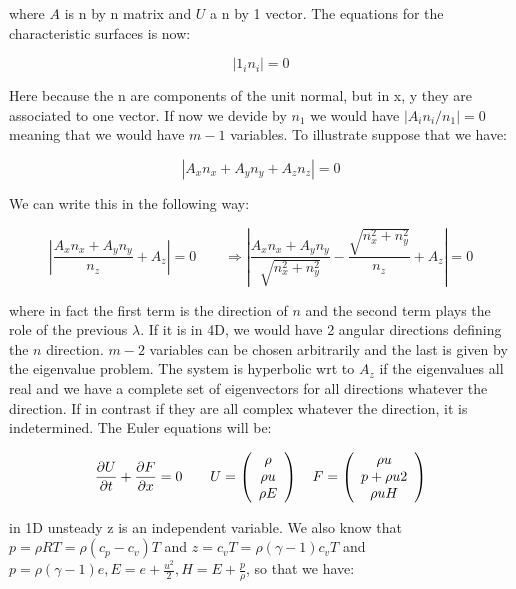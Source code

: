 where $A$ is n by n matrix and $U$ a n by 1 vector. The equations for the characteristic surfaces is now: 

\begin{equation}
|1_i n_i| = 0
\end{equation}

Here because the n are components of the unit normal, but in x, y they are associated to one vector. If now we devide by $n_1$ we would have $|A_i n_i/n_1| = 0$ meaning that we would have $m-1$ variables. To illustrate suppose that we have: 

\begin{equation}
|A_x n_x + A_yn_y + A_zn_z | = 0
\end{equation}

We can write this in the following way: 

\begin{equation}
\left|\frac{A_x n_x + A_y n_y}{n_z } + A_z\right| = 0 \qquad \Rightarrow \left|\frac{A_x n_x + A_y n_y}{\sqrt{n_x^2 + n_y^2}}- \frac{\sqrt{n_x^2 + n_y^2}}{n_z} + A_z\right| = 0
\end{equation}

where in fact the first term is the direction of $n$ and the second term plays the role of the previous $\lambda$. If it is in 4D, we would have 2 angular directions defining the $n$ direction. $m-2$ variables can be chosen arbitrarily and the last is given by the eigenvalue problem. The system is hyperbolic wrt to $A_z$ if the eigenvalues all real and we have a complete set of eigenvectors for all directions whatever the direction. If in contrast if they are all complex whatever the direction, it is indetermined. The Euler equations will be: 

\begin{equation}
\frac{\partial U}{\partial t } + \frac{\partial F}{\partial x} = 0 \qquad 
U = \left(
\begin{array}{c}
\rho \\
\rho u\\
\rho E
\end{array}
\right)
\quad F = \left(
\begin{array}{c}
\rho u\\
p + \rho u 2\\
\rho uH
\end{array}
\right)
\end{equation}

in 1D unsteady z is an independent variable. We also know that $p = \rho RT = \rho (c_p - c_v) T$ and $z = c_v T = \rho (\gamma -1)c_v T$ and $p =\rho (\gamma -1)e, E = e+\frac{u^2}{2}, H = E + \frac{p}{\rho}$, so that we have: 

